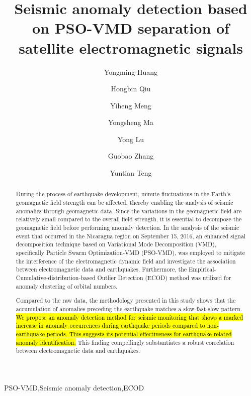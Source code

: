 \documentclass[3p,authoryear,preprint,12pt]{elsarticle}
\makeatletter
\def\ead{\@ifnextchar[{\@uad}{\@ead}}
\gdef\@ead#1{\bgroup
   \def\_{\string\underscorechar\space}
   \def\{{\string\lbracechar\space}
   \def\textdagger{\string\textdagger\space}
   \def\texttildeapprox{\string\texttildeapprox\space}
   \def~{\hashchar\space}
   \def\}{\string\rbracechar\space}
   \edef\tmp{\the\@eadauthor}
   \immediate\write\@auxout{\string\emailauthor
     {#1}{\expandafter\strip@prefix\meaning\tmp}}
  \egroup
}
\gdef\emailauthor#1#2{\stepcounter{ead}
      \g@addto@macro\@elseads{\raggedright
      \let\corref\@gobble
      \eadsep\texttt{#1} (#2)
      \def\eadsep{\unskip,\space}}
}
\makeatother
\begin{document}
\begin{frontmatter}

    \title{
  Seismic anomaly detection based on PSO-VMD separation of satellite electromagnetic signals    
}
    
\author[1]{Yongming Huang}
\ead{huang\_ym@seu.edu.cn}\cortext[c-8fddee302652]{Corresponding author.}
\author[1]{Hongbin Qiu}
\author[1]{Yiheng Meng}

\author[1]{Yongsheng Ma}
\author[2]{Yong Lu}
\author[1]{Guobao Zhang}
\author[3]{Yuntian Teng}   
\address[1]{
    Southeast University\unskip, Nanjing\unskip, 210096\unskip, China}
\address[2]{Seismological Bureau of Jiangsu Province\unskip, Nanjing\unskip, 210006\unskip, China}
\address[3]{Institute of Geophysics\unskip, China Earthquake Administration\unskip, Beijing\unskip, 100081\unskip, China}
  

\begin{abstract}

During the process of earthquake development, minute fluctuations in the Earth's geomagnetic field strength can be affected, thereby enabling the analysis of seismic anomalies through geomagnetic data. Since the variations in the geomagnetic field are relatively small compared to the overall field strength, it is essential to decompose the geomagnetic field before performing anomaly detection. In the analysis of the seismic event that occurred in the Nicaragua region on September 15, 2016, an enhanced signal decomposition technique based on Variational Mode Decomposition (VMD), specifically Particle Swarm Optimization-VMD (PSO-VMD), was employed to mitigate the interference of the electromagnetic dynamic field and investigate the association between electromagnetic data and earthquakes. Furthermore, the Empirical-Cumulative-distribution-based Outlier Detection (ECOD) method was utilized for anomaly clustering of orbital numbers.

{Compared to the raw data, the methodology presented in this study shows that the accumulation of anomalies preceding the earthquake matches a slow-fast-slow pattern.} \hl{We propose an anomaly detection method for seismic monitoring that shows a marked increase in anomaly occurrences during earthquake periods compared to non-earthquake periods. This suggests its potential effectiveness for earthquake-related anomaly identification.} This finding compellingly substantiates a robust correlation between electromagnetic data and earthquakes.
\end{abstract}
      \begin{keyword}
    PSO-VMD\sep Seismic anomaly detection\sep ECOD
      \end{keyword}
    
  \end{frontmatter}
\end{document}
